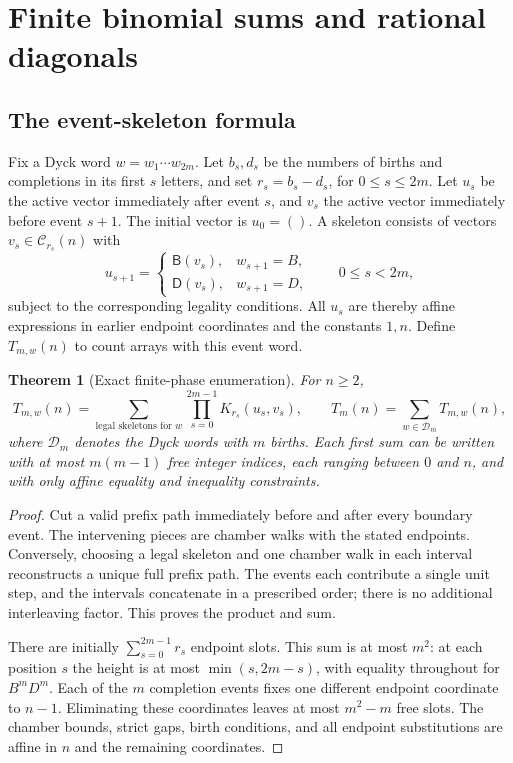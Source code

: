 \documentclass[11pt,letterpaper]{article}
\numberwithin{equation}{section}
\newtheorem{theorem}{Theorem}[section]
\theoremstyle{definition}
\newcommand{\1}{\mathbf 1}
\begin{document}
\section{Finite binomial sums and rational diagonals}
\label{shr:bp:sec:binomial}

\subsection{The event-skeleton formula}
Fix a Dyck word $w=w_1\cdots w_{2m}$. Let $b_s,d_s$ be the numbers of
births and completions in its first $s$ letters, and set
$r_s=b_s-d_s$, for $0\le s\le2m$. Let $u_s$ be the active vector
immediately after event $s$, and $v_s$ the active vector immediately
before event $s+1$. The initial vector is $u_0=()$.
A skeleton consists of vectors $v_s\in\mathcal C_{r_s}(n)$ with
\begin{equation}
 u_{s+1}=
 \begin{cases}
 \mathsf B(v_s),&w_{s+1}=B,\\
 \mathsf D(v_s),&w_{s+1}=D,
 \end{cases}
 \qquad 0\le s<2m,
 \label{shr:bp:eq:skeletonmap}
\end{equation}
subject to the corresponding legality conditions. All $u_s$ are thereby
affine expressions in earlier endpoint coordinates and the constants
$1,n$. Define $T_{m,w}(n)$ to count arrays with this event word.

\begin{theorem}[Exact finite-phase enumeration]
\label{shr:bp:thm:skeleton}
For $n\ge2$,
\begin{equation}
 T_{m,w}(n)=
 \sum_{\text{legal skeletons for }w}
 \prod_{s=0}^{2m-1}K_{r_s}(u_s,v_s),
 \qquad
 T_m(n)=\sum_{w\in\mathcal D_m}T_{m,w}(n),
 \label{shr:bp:eq:skeleton}
\end{equation}
where $\mathcal D_m$ denotes the Dyck words with $m$ births.
Each first sum can be written with at most $m(m-1)$ free integer indices,
each ranging between $0$ and $n$, and with only affine equality and
inequality constraints.
\end{theorem}

\begin{proof}
Cut a valid prefix path immediately before and after every boundary event.
The intervening pieces are chamber walks with the stated endpoints.
Conversely, choosing a legal skeleton and one chamber walk in each interval
reconstructs a unique full prefix path. The events each contribute a
single unit step, and the intervals concatenate in a prescribed order;
there is no additional interleaving factor. This proves the product and sum.

There are initially $\sum_{s=0}^{2m-1}r_s$ endpoint slots. This sum is at
most $m^2$: at each position $s$ the height is at most
$\min(s,2m-s)$, with equality throughout for $B^mD^m$. Each of the $m$
completion events fixes one different endpoint coordinate to $n-1$.
Eliminating these coordinates leaves at most $m^2-m$ free slots. The
chamber bounds, strict gaps, birth conditions, and all endpoint
substitutions are affine in $n$ and the remaining coordinates.
\end{proof}
\end{document}
